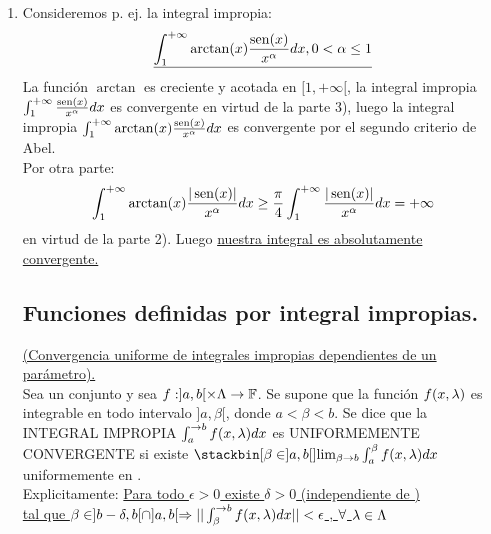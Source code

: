 \begin{enumerate}[1)]
\begin{equation}
\end{equation}
Para $R \flecha +\infty$, el segundo miembro de $(1)$ tiende a un límite en virtud de la parte 3), luego la integral impropia \\
\underline{$\int_0^{+\infty}\sen(x^2)dx$ es convergente.} Asimismo, se ve que la integral impropia \\
\underline{$\int_0^{+\infty}\cos(x^2)dx$ es convergente.} Por cierto la relación (1.14) suministra:\\
$$
\int_0^{+\infty}\sen (x^2)dx=\frac{1}{2}\int_0^{\to +\infty}\frac{\sen (t)}{\sqrt{t}dt}.
$$
Sin embargo, \underline{dichas integrales no son absolutamente convergentes.}\\
Pues si p. ej. la función \x \flecha $\sen x^2$ fuese integrable en $[0,+\infty[$, en virtud del teorema de cambio de variables también la función $t\flecha \frac{\sen (t)}{\sqrt{t}}$ sería integrable en $[0,+\infty[$ y esto no es el caso conforme a lo establecido en 2).\\
\item Consideremos p. ej. la integral impropia:
\begin{equation*}
\underline{\int_1^{+\infty}\arctan (x)\frac{\operatorname{sen} (x)}{x^\alpha}dx, 0 < \alpha \leq 1}
\end{equation*}
La función $\arctan$ es creciente y acotada en $[1,+\infty[$, la integral impropia $\int_1^{+\infty}\frac{\operatorname{sen} (x)}{x^\alpha}dx$ es convergente en virtud de la parte 3), luego la integral impropia $\int_1^{+\infty}  \arctan (x) \frac{\operatorname{sen} (x)}{x^\alpha}dx$ es convergente por el segundo criterio de Abel.\\
Por otra parte:\\
$$
\int_1^{+\infty}\arctan (x)\frac{|\operatorname{sen} (x)|}{x^\alpha}dx \geq \frac{\pi}{4}\int_1^{+\infty}\frac{|\operatorname{sen} (x)|}{x^\alpha}dx=+\infty
$$
en virtud de la parte 2). Luego \underline{nuestra integral es absolutamente}\\
\underline{convergente.}
\subsection{Funciones definidas por integral impropias.}
\underline{(Convergencia uniforme de integrales impropias dependientes de un} \\
\underline{parámetro).}\\
Sea \Lam \phantom{} un conjunto y sea $f:]a,b[ \times \Lambda \rightarrow \mathbb{F}$. Se supone que \todo \lam \en \Lam \phantom{} la función \x \flecha $f(x,\lambda)$ es integrable en todo intervalo $]a,\beta[$, donde $a <\beta <b$. Se dice que la INTEGRAL IMPROPIA $\int_a^{\to b }f(x,\lambda)dx$ es UNIFORMEMENTE CONVERGENTE si existe $\stackbin[\beta \en ]a,b[]{}{\lim_{\beta \to b}}\int_a^{\beta}f(x,\lam)dx$ uniformemente en \Lam .\\
Explicitamente: \underline{Para todo $\epsilon>0$ existe $\delta >0$ (independiente de \lam)}\\
\underline{tal que $\beta \in ]b-\delta,b[ \cap ]a,b[ \Rightarrow || \int_\beta^{\to b}f(x,\lambda)dx|| < \epsilon$ , $\forall$ $\lambda \in \Lambda$}
\end{enumerate} 

